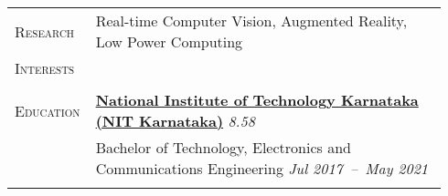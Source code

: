 \documentclass[letterpaper, 10pt, oneside]{article}
\newcommand{\stitle}[1]{\normalsize{\textsc{#1}}}
\begin{document}
\noindent \begin{longtable}{@{} p{0.14\linewidth} p{0.8\linewidth}}

    \stitle{Research}   & Real-time Computer Vision, Augmented Reality, Low Power Computing                                                       \\
    \stitle{Interests}  &                                                                                                                         \\
    \\


    \stitle{Education}  & \textbf{\href{https://nitk.ac.in}{National Institute of Technology Karnataka (NIT Karnataka)}} \hfill \textsl{8.58}     \\
                        & Bachelor of Technology, Electronics and Communications Engineering \hfill \hspace{-3em} \textsl{Jul 2017\ --\ May 2021} \\
    \\





\end{longtable}
\end{document}
